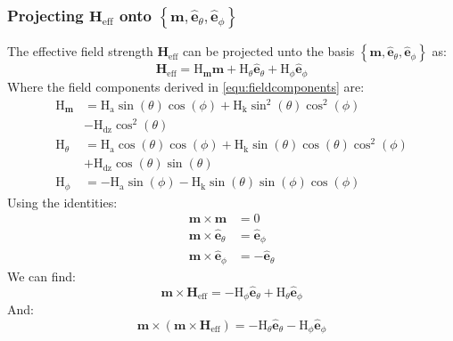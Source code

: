 \documentclass[reprint,amsmath,amssymb,aps, floatfix]{revtex4-2}
\begin{document}
\subsubsection{Projecting $\mathbf{H}_{\text{eff}}$ onto $\left\{\mathbf{m}, \hat{\mathbf{e}}_{\theta}, \hat{\mathbf{e}}_{\phi}\right\}$}
The effective field strength $\mathbf{H}_{\text{eff}}$ can be projected unto the basis $\left\{\mathbf{m}, \hat{\mathbf{e}}_{\theta}, \hat{\mathbf{e}}_{\phi}\right\}$ as:
\begin{equation}
    \mathbf{H}_{\text{eff}} = \text{H}_{\mathbf{m}}\mathbf{m} + \text{H}_{\theta}\hat{\mathbf{e}}_{\theta} + \text{H}_{\phi}\hat{\mathbf{e}}_{\phi}
\end{equation}
Where the field components derived in \autoref{equ:fieldcomponents} are:
\begin{equation}
    \begin{aligned}
        \text{H}_{\mathbf{m}} & = \text{H}_{\text{a}}\sin(\theta)\cos(\phi) + \text{H}_{\text{k}}\sin^2(\theta)\cos^2(\phi) \\
        & - \text{H}_{\text{dz}}\cos^2(\theta) \\[1ex]
        \text{H}_{\theta} & = \text{H}_{\text{a}}\cos(\theta)\cos(\phi) + \text{H}_{\text{k}}\sin(\theta)\cos(\theta)\cos^2(\phi) \\ 
        & + \text{H}_{\text{dz}}\cos(\theta)\sin(\theta) \\[1ex]
        \text{H}_{\phi} & = -\text{H}_{\text{a}}\sin(\phi) - \text{H}_{\text{k}}\sin(\theta)\sin(\phi)\cos(\phi)
    \end{aligned}
\end{equation}
Using the identities:
\begin{equation}
    \begin{aligned}
        \mathbf{m}\times\mathbf{m} & = 0 \\[1ex]
        \mathbf{m}\times\hat{\mathbf{e}}_{\theta} & = \hat{\mathbf{e}}_{\phi} \\[1ex]
        \mathbf{m}\times\hat{\mathbf{e}}_{\phi} & = -\hat{\mathbf{e}}_{\theta}
    \end{aligned}
    \label{equ:mthetaphi_identities}
\end{equation}
We can find:
\begin{equation}
    \mathbf{m}\times\mathbf{H}_{\text{eff}}=-\text{H}_{\phi}\hat{\mathbf{e}}_{\theta}+\text{H}_{\theta}\hat{\mathbf{e}}_{\phi}
\end{equation}
And:
\begin{equation}
    \mathbf{m}\times\left(\mathbf{m}\times\mathbf{H}_{\text{eff}}\right)=-\text{H}_{\theta}\hat{\mathbf{e}}_{\theta}-\text{H}_{\phi}\hat{\mathbf{e}}_{\phi}
\end{equation}
\end{document}
